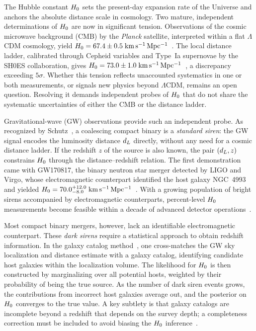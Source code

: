 
The Hubble constant $H_0$ sets the present-day expansion rate of the
Universe and anchors the absolute distance scale in cosmology.  Two
mature, independent determinations of $H_0$ are now in significant
tension.  Observations of the cosmic microwave background (CMB) by the
\textit{Planck} satellite, interpreted within a flat $\Lambda$CDM
cosmology, yield $H_0 = 67.4 \pm 0.5\;\mathrm{km\,s^{-1}\,Mpc^{-1}}$~\cite{Planck:2018vyg}.
The local distance ladder, calibrated through Cepheid variables and
Type~Ia supernovae by the SH0ES collaboration, gives $H_0 = 73.0 \pm
1.0\;\mathrm{km\,s^{-1}\,Mpc^{-1}}$~\cite{Riess:2021jrx}, a
discrepancy exceeding $5\sigma$.  Whether this tension reflects
unaccounted systematics in one or both measurements, or signals new
physics beyond $\Lambda$CDM, remains an open question.  Resolving it
demands independent probes of $H_0$ that do not share the systematic
uncertainties of either the CMB or the distance ladder.

Gravitational-wave (GW) observations provide such an independent
probe.  As recognized by Schutz~\cite{Schutz:1986gp}, a coalescing
compact binary is a \textit{standard siren}: the GW signal encodes the
luminosity distance $d_L$ directly, without any need for a cosmic
distance ladder.  If the redshift $z$ of the source is also known, the
pair $(d_L, z)$ constrains $H_0$ through the distance--redshift
relation.  The first demonstration came with GW170817, the binary
neutron star merger detected by LIGO and Virgo, whose electromagnetic
counterpart identified the host galaxy NGC~4993 and yielded $H_0 =
70.0^{+12.0}_{-8.0}\;\mathrm{km\,s^{-1}\,Mpc^{-1}}$~\cite{Abbott:2017xzu}.
With a growing population of bright sirens accompanied by
electromagnetic counterparts, percent-level $H_0$ measurements become
feasible within a decade of advanced detector
operations~\cite{Chen:2017rfc}.

Most compact binary mergers, however, lack an identifiable
electromagnetic counterpart.  These \textit{dark sirens} require a
statistical approach to obtain redshift information.  In the galaxy
catalog method~\cite{Schutz:1986gp,Gray:2019ksv}, one cross-matches
the GW sky localization and distance estimate with a galaxy catalog,
identifying candidate host galaxies within the localization volume.
The likelihood for $H_0$ is then constructed by marginalizing over all
potential hosts, weighted by their probability of being the true
source.  As the number of dark siren events grows, the contributions
from incorrect host galaxies average out, and the posterior on $H_0$
converges to the true value.  A key subtlety is that galaxy catalogs
are incomplete beyond a redshift that depends on the survey depth; a
completeness correction must be included to avoid biasing the $H_0$
inference~\cite{Gray:2019ksv,Gair:2022zsa}.

